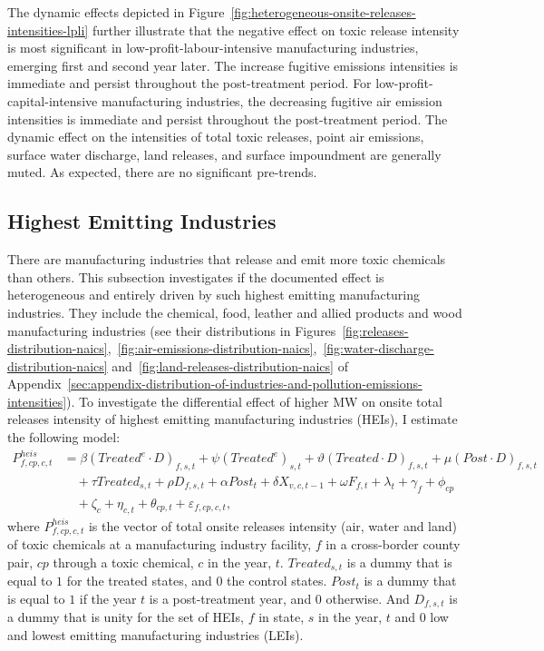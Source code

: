 \documentclass{C:/Users/david/OneDrive/Documents/ULMS/PhD/Thesis/chapter3/src/climate_change/latex/Economic_Journal/OUP-EJ}
\begin{document}
    The dynamic effects depicted in Figure~\ref{fig:heterogeneous-onsite-releases-intensities-lpli} further illustrate that the negative effect on toxic release intensity is most significant in low-profit-labour-intensive manufacturing industries, emerging first and second year later. The increase fugitive emissions intensities is immediate and persist throughout the post-treatment period. For low-profit-capital-intensive manufacturing industries, the decreasing fugitive air emission intensities is immediate and persist throughout the post-treatment period. The dynamic effect on the intensities of total toxic releases, point air emissions, surface water discharge, land releases, and surface impoundment are generally muted. As expected, there are no significant pre-trends.
    

    \subsection{Highest Emitting Industries}\label{subsec:highest-emitting-industries}
    There are manufacturing industries that release and emit more toxic chemicals than others. This subsection investigates if the documented effect is heterogeneous and entirely driven by such highest emitting manufacturing industries. They include the chemical, food, leather and allied products and wood manufacturing industries (see their distributions in Figures~\ref{fig:releases-distribution-naics},~\ref{fig:air-emissions-distribution-naics},~\ref{fig:water-discharge-distribution-naics} and~\ref{fig:land-releases-distribution-naics} of Appendix~\ref{sec:appendix-distribution-of-industries-and-pollution-emissions-intensities}). To investigate the differential effect of higher MW on onsite total releases intensity of highest emitting manufacturing industries (HEIs), I estimate the following model:
    \begin{align}
        P_{f,cp,c,t}^{heis} &= \beta (Treated^{e} \cdot D)_{f,s,t} + \psi (Treated^{e})_{s,t} + \vartheta (Treated \cdot D)_{f,s,t} + \mu (Post \cdot D)_{f,s,t} \nonumber \\
        &\quad + \tau Treated_{s,t} + \rho D_{f,s,t} + \alpha Post_{t} + \delta X_{v,c,t-1} + \omega F_{f,t} + \lambda_{t} + \gamma_{f} + \phi_{cp} \nonumber \\
        &\quad + \zeta_{c} + \eta_{c,t} + \theta_{cp,t} + \varepsilon_{f,cp,c,t},\label{eq:heterogeneous-onsite-releases-intensity-heis}
    \end{align}
    where $P_{f,cp,c,t}^{heis}$ is the vector of total onsite releases intensity (air, water and land) of toxic chemicals at a manufacturing industry facility, $f$ in a cross-border county pair, $cp$ through a toxic chemical, $c$ in the year, $t$. $Treated_{s,t}$ is a dummy that is equal to $1$ for the treated states, and $0$ the control states. $Post_{t}$ is a dummy that is equal to $1$ if the year $t$ is a post-treatment year, and $0$ otherwise. And $D_{f,s,t}$ is a dummy that is unity for the set of HEIs, $f$ in state, $s$ in the year, $t$ and $0$ low and lowest emitting manufacturing industries (LEIs).
    
\end{document}
